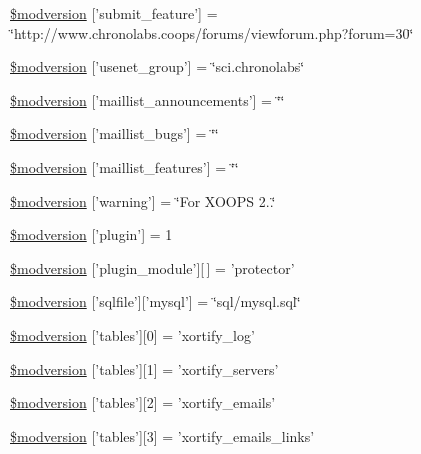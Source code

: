 \begin{DoxyCompactItemize}
\item 
\hyperlink{xoops__version_8php_af10a40e06ffacd8c9887aa19248962ea}{\$modversion} \mbox{[}'submit\-\_\-feature'\mbox{]} = \char`\"{}http\-://www.\-chronolabs.\-coops/forums/viewforum.\-php?forum=30\char`\"{}
\item 
\hyperlink{xoops__version_8php_a1d2b2a5769eed42798472aa6383b4138}{\$modversion} \mbox{[}'usenet\-\_\-group'\mbox{]} = \char`\"{}sci.\-chronolabs\char`\"{}
\item 
\hyperlink{xoops__version_8php_a9817ed669ea459a38ad8246e621165da}{\$modversion} \mbox{[}'maillist\-\_\-announcements'\mbox{]} = \char`\"{}\char`\"{}
\item 
\hyperlink{xoops__version_8php_a8be69d7d0067839ed0cd81d6f111d055}{\$modversion} \mbox{[}'maillist\-\_\-bugs'\mbox{]} = \char`\"{}\char`\"{}
\item 
\hyperlink{xoops__version_8php_a000d0d88cf59a126590d556801104982}{\$modversion} \mbox{[}'maillist\-\_\-features'\mbox{]} = \char`\"{}\char`\"{}
\item 
\hyperlink{xoops__version_8php_a6ae62ef6c07aedb85c0b8bf322d0f7e8}{\$modversion} \mbox{[}'warning'\mbox{]} = \char`\"{}For X\-O\-O\-P\-S 2..\char`\"{}
\item 
\hyperlink{xoops__version_8php_aa0600b3f3df5403c2b15717e099226dc}{\$modversion} \mbox{[}'plugin'\mbox{]} = 1
\item 
\hyperlink{xoops__version_8php_a28296a9c643048f6555da1e126a29bc6}{\$modversion} \mbox{[}'plugin\-\_\-module'\mbox{]}\mbox{[}$\,$\mbox{]} = 'protector'
\item 
\hyperlink{xoops__version_8php_a5836e107844ac303be9f58f51a8a4fd4}{\$modversion} \mbox{[}'sqlfile'\mbox{]}\mbox{[}'mysql'\mbox{]} = \char`\"{}sql/mysql.\-sql\char`\"{}
\item 
\hyperlink{xoops__version_8php_a890ca3f221b00adef5ce8b87a4356816}{\$modversion} \mbox{[}'tables'\mbox{]}\mbox{[}0\mbox{]} = 'xortify\-\_\-log'
\item 
\hyperlink{xoops__version_8php_a94b725b908acb5b9c52aaf824ee08ce4}{\$modversion} \mbox{[}'tables'\mbox{]}\mbox{[}1\mbox{]} = 'xortify\-\_\-servers'
\item 
\hyperlink{xoops__version_8php_a434fdfe156f54f0edcc90301816a25c4}{\$modversion} \mbox{[}'tables'\mbox{]}\mbox{[}2\mbox{]} = 'xortify\-\_\-emails'
\item 
\hyperlink{xoops__version_8php_a29fb3292cffa7f059ff569297785761c}{\$modversion} \mbox{[}'tables'\mbox{]}\mbox{[}3\mbox{]} = 'xortify\-\_\-emails\-\_\-links'
\item 

\end{DoxyCompactItemize}
